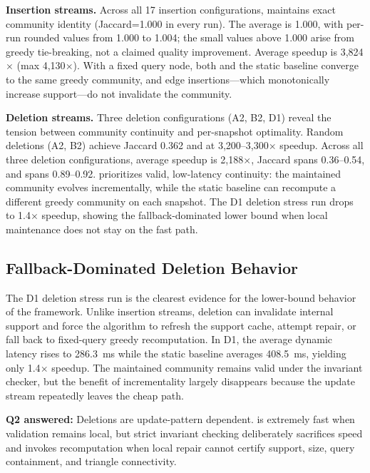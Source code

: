 \textbf{Insertion streams.} Across all 17 insertion configurations, \DynaSCSH maintains exact community identity (Jaccard=1.000 in every run). The average \qratio is 1.000, with per-run rounded values from 1.000 to 1.004; the small values above 1.000 arise from greedy tie-breaking, not a claimed quality improvement. Average speedup is 3,824$\times$ (max 4,130$\times$). With a fixed query node, both \DynaSCSH and the static baseline converge to the same greedy community, and edge insertions---which monotonically increase support---do not invalidate the community.

\textbf{Deletion streams.} Three deletion configurations (A2, B2, D1) reveal the tension between community continuity and per-snapshot optimality. Random deletions (A2, B2) achieve Jaccard 0.362 and  at 3,200--3,300$\times$ speedup. Across all three deletion configurations, average speedup is 2,188$\times$, Jaccard spans 0.36--0.54, and \qratio spans 0.89--0.92. \DynaSCSH prioritizes valid, low-latency continuity: the maintained community evolves incrementally, while the static baseline can recompute a different greedy community on each snapshot. The D1 deletion stress run drops to 1.4$\times$ speedup, showing the fallback-dominated lower bound when local maintenance does not stay on the fast path.

\subsection{Fallback-Dominated Deletion Behavior}

The D1 deletion stress run is the clearest evidence for the lower-bound behavior of the framework. Unlike insertion streams, deletion can invalidate internal support and force the algorithm to refresh the support cache, attempt repair, or fall back to fixed-query greedy recomputation. In D1, the average dynamic latency rises to 286.3~ms while the static baseline averages 408.5~ms, yielding only 1.4$\times$ speedup. The maintained community remains valid under the invariant checker, but the benefit of incrementality largely disappears because the update stream repeatedly leaves the cheap path.

\textbf{Q2 answered:} Deletions are update-pattern dependent. \DynaSCSH is extremely fast when validation remains local, but strict invariant checking deliberately sacrifices speed and invokes recomputation when local repair cannot certify support, size, query containment, and triangle connectivity.

